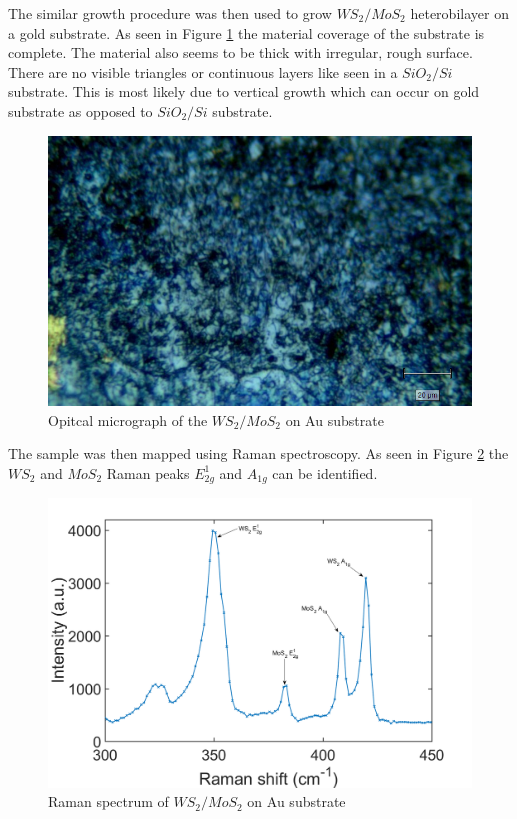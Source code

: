 The similar growth procedure was then used to grow $WS_2/MoS_2$ heterobilayer on a gold substrate. As seen in Figure \ref{fig:HeterostructuresOMAu} the material coverage of the substrate is complete. The material also seems to be thick with irregular, rough surface. There are no visible triangles or continuous layers like seen in a $SiO_2/Si$ substrate. This is most likely due to vertical growth which can occur on gold substrate as opposed to $SiO_2/Si$ substrate.

\begin{figure}[H]
	\begin{center}
		\includegraphics[scale=0.4]{Heterostructures/OMAu.png}
		\caption{Opitcal micrograph of the $WS_2/MoS_2$ on Au substrate}
		\label{fig:HeterostructuresOMAu}
	\end{center}
\end{figure}

The sample was then mapped using Raman spectroscopy. As seen in Figure \ref{fig:HeterostructuresRamanSpectrumAu} the $WS_2$ and $MoS_2$ Raman peaks $E^1_{2g}$ and $A_{1g}$ can be identified.

\begin{figure}[H]
	\begin{center}
		\includegraphics[scale=0.3]{Heterostructures/RamanSpectrumAu.png}
		\caption{Raman spectrum of $WS_2/MoS_2$ on Au substrate}
		\label{fig:HeterostructuresRamanSpectrumAu}
	\end{center}
\end{figure}

